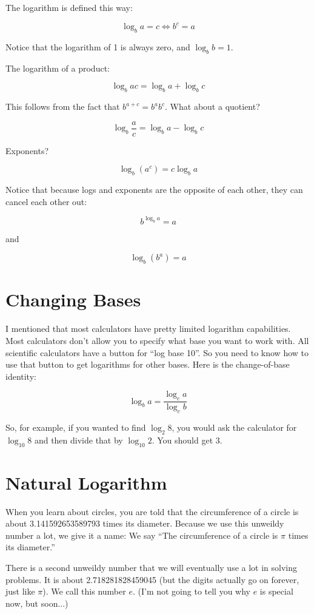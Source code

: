The logarithm is defined this way:

$$\log_b a = c \iff b^c = a$$

Notice that the logarithm of 1 is always zero, and $\log_b b = 1$.

The logarithm of a product:

$$\log_b a c = \log_b a + \log_b c$$

This follows from the fact that $b^{a + c} = b^a b^c$. What about a quotient?

$$\log_b \frac{a}{c} = \log_b a - \log_b c$$

Exponents?

$$\log_b \left(a^c\right) = c \log_b a$$

Notice that because logs and exponents are the opposite of each other, they can cancel each other out:

$$b^{\log_b a} = a$$

and

$$\log_b \left(b^a\right) = a$$

\section{Changing Bases}

I mentioned that most calculators have pretty limited logarithm
capabilities. Most calculators don't allow you to specify what base
you want to work with. All scientific calculators have a button for
``log base 10''.  So you need to know how to use that button to get
logarithms for other bases. Here is the change-of-base identity:

$$\log_b a = \frac {\log_c a}{\log_c b}$$

So, for example, if you wanted to find $\log_2 8$, you would ask the
calculator for $\log_{10} 8$ and then divide that by $\log_{10} 2$.
You should get 3.

\section{Natural Logarithm}

When you learn about circles, you are told that the circumference of a
circle is about 3.141592653589793 times its diameter.  Because we use
this unweildy number a lot, we give it a name: We say ``The
circumference of a circle is $\pi$ times its diameter.''

There is a second unweildy number that we will eventually use a lot in
solving problems.  It is about 2.718281828459045 (but the digits
actually go on forever, just like $\pi$). We call this number $e$. (I'm
not going to tell you why $e$ is special now, but soon...)

